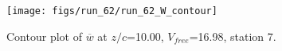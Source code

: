 \begin{figure}[H]
\centering
\texttt{[image: figs/run\_62/run\_62\_W\_contour]}
\caption{Contour plot of $\overline{w}$ at $z/c$=10.00, $V_{free}$=16.98, station 7.}
\end{figure}


